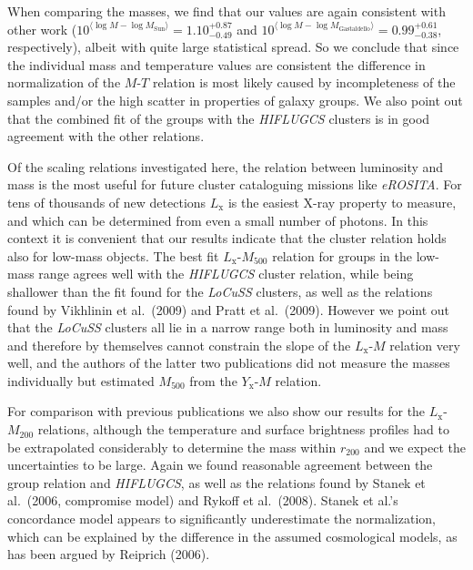 \documentclass[structabstract]{aa}
\begin{document}
When comparing the masses, we find that our values are again
consistent with other work ($10^{\langle \log M-\log
  M_{\text{Sun}}\rangle}=1.10^{+0.87}_{-0.49}$ and $10^{\langle \log M
  -\log M_{\text{Gastaldello}}\rangle}=0.99^{+0.61}_{-0.38}$,
respectively), albeit with quite large statistical spread. So we
conclude that since the individual mass and temperature values
  are consistent the difference in normalization of the $M$-$T$
relation is most likely caused by incompleteness of the samples and/or
the high scatter in properties of galaxy groups. We also point
  out that the combined fit of the groups with the \emph{HIFLUGCS}
  clusters is in good agreement with the other relations.

Of the scaling relations investigated here, the relation between
luminosity and mass is the most useful for future cluster cataloguing
missions like \emph{eROSITA}. For tens of thousands of new
  detections $L_{\text{x}}$ is the easiest X-ray property to measure,
  and which can be determined from even a small number of
  photons. In this context it is convenient that our results
indicate that the cluster relation holds also for low-mass
objects. The best fit $L_{\text{x}}$-$M_{500}$ relation for groups in
the low-mass range agrees well with the \emph{HIFLUGCS} cluster
relation, while being shallower than the fit found for
the \emph{LoCuSS} clusters, as well as the relations found by
Vikhlinin et al.\ (2009) and Pratt et al.\ (2009). However we point
out that the \emph{LoCuSS} clusters all lie in a narrow range both in
luminosity and mass and therefore by themselves cannot constrain the
slope of the $L_{\text{x}}$-$M$ relation very well, and the authors
of the latter two publications did not measure the masses individually
but estimated $M_{500}$ from the $Y_{\text{x}}$-$M$ relation.

For comparison with previous publications we also show our results for
the $L_{\text{x}}$-$M_{200}$ relations, although the temperature and
surface brightness profiles had to be extrapolated considerably to
determine the mass within $r_{200}$ and we expect the
  uncertainties to be large. Again we found reasonable agreement
between the group relation and \emph{HIFLUGCS}, as well as the
relations found by Stanek et al.\ (2006, compromise model) and Rykoff
et al.\ (2008). Stanek et al.'s concordance model appears to
significantly underestimate the normalization, which can be explained
by the difference in the assumed cosmological models, as has been
argued by Reiprich (2006).
\end{document}
